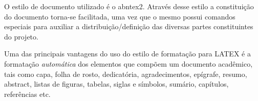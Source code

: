 O estilo de documento utilizado é o {\ttfamily abntex2}. Através desse estilo a constituição do documento torna-se facilitada, uma vez que o mesmo possui comandos especiais para auxiliar a distribuição/definição das diversas partes constituintes do projeto. 


Uma das principais vantagens do uso do estilo de formatação para LATEX é a formatação \textit{automática} dos elementos que compõem um documento acadêmico, tais como capa, folha de rosto, dedicatória, agradecimentos, epígrafe, resumo, abstract, listas de figuras, tabelas, siglas e símbolos, sumário, capítulos, referências etc.


